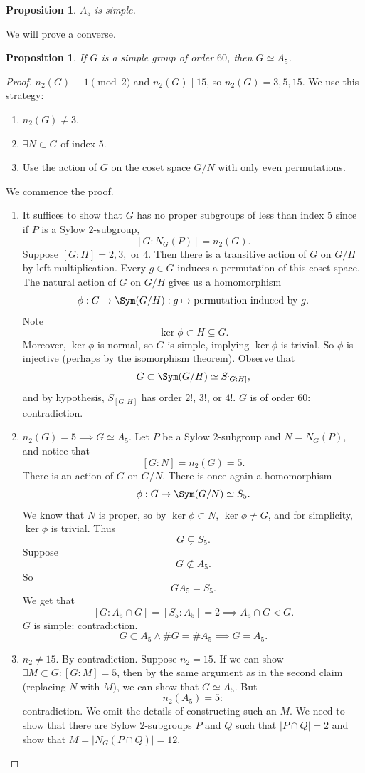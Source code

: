 \documentclass[11pt, oneside]{amsart}
\numberwithin{equation}{section}
\numberwithin{theorem}{section}
\newtheorem{proposition}[theorem]{Proposition}
\theoremstyle{definition}
\begin{document}
{\begin{proposition}
$A_5$ is simple.
\end{proposition}
We will prove a converse.
\begin{proposition}
If $G$ is a simple group of order $60$, then $G \simeq A_5$.
\end{proposition}
\begin{proof}
$n_2(G)\equiv 1\pmod 2$ and $n_2(G) \mid 15$, so $n_2(G) = 3,5,15$. We use this strategy:
\begin{enumerate}[label=(\roman*)]
\item $n_2(G) \neq 3$.
\item $\exists N\subset G$ of index $5$.
\item Use the action of $G$ on the coset space $G/N$ with only even permutations. 
\end{enumerate}
We commence the proof.
\begin{enumerate}[label=(\roman*)]
\item It suffices to show that $G$ has no proper subgroups of less than index $5$ since if $P$ is a Sylow $2$-subgroup, 
$$
[G:N_G(P)] = n_2(G).
$$
Suppose $[G:H] = 2,3,\textrm{ or }4$. Then there is a transitive action of $G$ on $G/H$ by left multiplication. Every $g\in G$ induces a permutation of this coset space. The natural action of $G$ on $G/H$ gives us a homomorphism 
$$
\phi : G \to \Sym(G/H) : g\mapsto \textrm{permutation induced by $g$}. 
$$
Note 
$$
\ker\phi \subset H \subsetneq G.
$$
Moreover, $\ker \phi$ is normal, so $G$ is simple, implying $\ker\phi $ is trivial. So $\phi$ is injective (perhaps by the isomorphism theorem). Observe that
$$
G\subset \Sym(G/H) \simeq S_{[G:H]},
$$
and by hypothesis, $S_{[G:H]}$ has order $2!$, $3!$, or $4!$. $G$ is of order $60$: contradiction. 

\item $n_2(G) = 5\implies G\simeq A_5$. Let $P$ be a Sylow $2$-subgroup and $N=N_G(P)$, and notice that
$$
[G:N] = n_2(G) = 5.
$$
There is an action of $G$ on $G/N$. There is once again a homomorphism 
$$
\phi : G\to\Sym(G/N) \simeq S_5.
$$
We know that $N$ is proper, so by $\ker\phi\subset N$, $\ker \phi\neq G$, and for simplicity, $\ker \phi$ is trivial. Thus 
$$
G\subsetneq S_5.
$$
Suppose 
$$
G\not\subset A_5.
$$
So
$$
GA_5 = S_5.
$$
We get that
$$
[G:A_5\cap G] = [S_5:A_5] = 2 \implies A_5\cap G \lhd G. %
$$
$G$ is simple: contradiction. 
$$
G\subset A_5 \land \# G = \# A_5 \implies G = A_5.
$$

\item $n_2\neq 15$. By contradiction. Suppose $n_2 = 15$. If we can show $\exists M\subset G : [G:M] =5$, then by the same argument as in the second claim (replacing $N$ with $M$), we can show that $G\simeq A_5$. But
$$
n_2(A_5) = 5:
$$
contradiction. We omit the details of constructing such an $M$. We need to show that there are Sylow $2$-subgroups $P$ and $Q$ such that $|P\cap Q|=2$ and show that $M = |N_G(P\cap Q)| = 12$.
\end{enumerate}
\end{proof}

}
\end{document}

